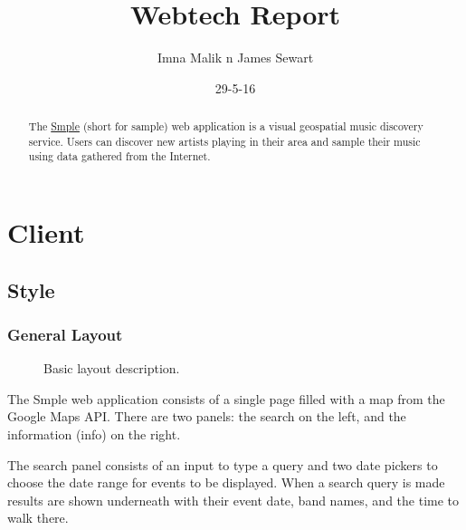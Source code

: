 \documentclass[10pt]{article}
\title{Webtech Report}
\author{Imna Malik n James Sewart}
\date{29-5-16}
\begin{document}
    \maketitle

    \tableofcontents


    \begin{abstract}
        The \href{https://smple.uk}{Smple} (short for sample) web application is a visual geospatial music discovery service. Users can discover new artists playing in their area and sample their music using data gathered from the Internet.
    \end{abstract}

    \section{Client}
        \subsection{Style}
            \subsubsection{General Layout}
                \begin{figure}[!ht]
                  \centering
                  \caption{Basic layout description.}
                \end{figure}

                The Smple web application consists of a single page filled with a map from the Google Maps API. There are two panels: the search on the left, and the information (info) on the right. 

                The search panel consists of an input to type a query and two date pickers to choose the date range for events to be displayed. When a search query is made results are shown underneath with their event date, band names, and the time to walk there.
\end{document}
